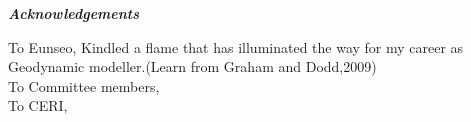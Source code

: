 \begin{center}
\textbf{\textit{Acknowledgements}}
\end{center}

To Eunseo,
Kindled a flame that has illuminated the way for my career as Geodynamic modeller.(Learn from Graham and Dodd,2009)
\\
To Committee members,
\\
To CERI, 
